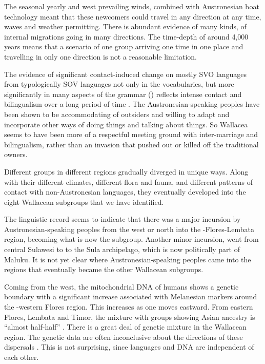 The seasonal yearly 
and west prevailing winds,
combined with Austronesian boat technology meant that these newcomers
could travel in any direction at any time,
waves and weather permitting.
There is abundant evidence of many kinds,
of internal migrations going in many directions.
The time-depth of around 4,000 years means that a scenario of
one group arriving one time in one place
and travelling in only one direction is not a reasonable limitation.

The evidence of significant contact-induced change on mostly
SVO languages from typologically SOV languages not only in the
vocabularies, but more significantly in many aspects of the grammar ()
reflects intense contact and bilingualism over a long period of time \citep{ThomasonKaufman1988}.
The Austronesian-speaking peoples have been shown to be accommodating
of outsiders and willing to adapt
and incorporate other ways of doing things
and talking about things.
So Wallacea seems to have been more of a respectful meeting ground
with inter-marriage and bilingualism, rather than an invasion that pushed out or
killed off the traditional owners.

Different groups in different regions gradually diverged in unique ways.
Along with their different climates,
different flora and fauna, and different patterns of contact
with non-Austronesian languages, they eventually developed into the eight Wallacean subgroups
that we have identified.

The linguistic record seems to indicate that there was a major
incursion by Austronesian-speaking peoples from the west or north
into the -Flores-Lembata region,
becoming what is now the  subgroup.
Another minor incursion, went from central Sulawesi to 
to the Sula archipelago,
which is now politically part of Maluku.
It is not yet clear where Austronesian-speaking peoples came
into the regions that eventually became the other Wallacean subgroups.

\largerpage
Coming from the west,
the mitochondrial DNA of humans shows a genetic boundary with
a significant increase associated with Melanesian markers around
the -western Flores region.
This increases as one moves eastward.
From eastern Flores, Lembata
and Timor, the mixture with groups showing Asian ancestry is
“almost half-half” \citep{Fricke2019,Klamer2019}.
There is a great deal of genetic mixture in the Wallacean region.
The genetic data are often inconclusive about the directions
of these dispersals \citep{LansingSudoyo2011}.
This is not surprising,
since languages and DNA are independent of each other.

